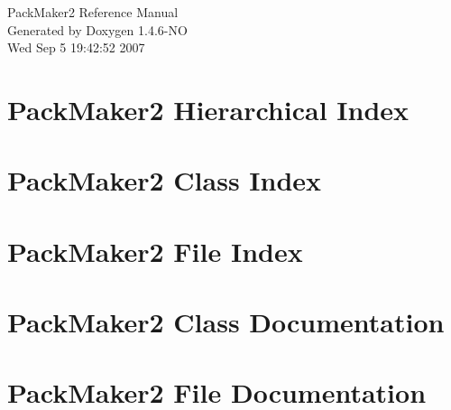 \documentclass[a4paper]{book}
\begin{document}
\begin{titlepage}
\vspace*{7cm}
\begin{center}
{\Large Pack\-Maker2 Reference Manual}\\
\vspace*{1cm}
{\large Generated by Doxygen 1.4.6-NO}\\
\vspace*{0.5cm}
{\small Wed Sep 5 19:42:52 2007}\\
\end{center}
\end{titlepage}
\clearemptydoublepage
{}
\tableofcontents
\clearemptydoublepage
{}
\chapter{Pack\-Maker2 Hierarchical Index}

\chapter{Pack\-Maker2 Class Index}

\chapter{Pack\-Maker2 File Index}

\chapter{Pack\-Maker2 Class Documentation}











\chapter{Pack\-Maker2 File Documentation}





















\printindex
\end{document}
